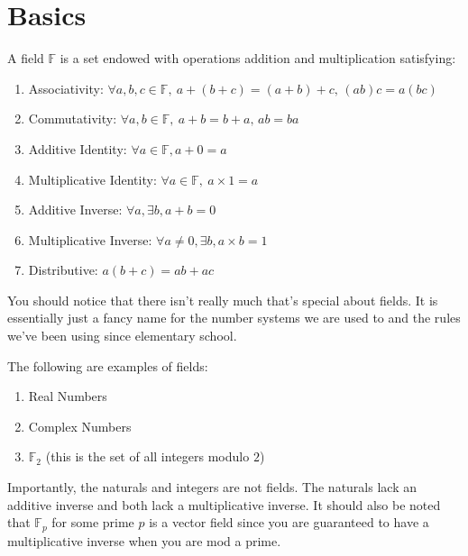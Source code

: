 \chapter{Basics}

\begin{definition}
    A field $\mathbb{F}$ is a set endowed with operations addition and multiplication satisfying:
    \begin{enumerate}
        \item Associativity: $\forall a,b,c\in\mathbb{F},\ a+(b+c)=(a+b)+c,\,(ab)c=a(bc)$
        \item Commutativity: $\forall a,b\in\mathbb{F},\ a+b=b+a,\, ab=ba$
        \item Additive Identity: $\forall a\in\mathbb{F}, a+0=a$
        \item Multiplicative Identity: $\forall a\in\mathbb{F},\ a\times 1=a$
        \item Additive Inverse: $\forall a,\exists b, a+b=0$
        \item Multiplicative Inverse: $\forall a\neq 0,\exists b, a\times b=1$
        \item Distributive: $a(b+c)=ab+ac$
    \end{enumerate}
\end{definition}
You should notice that there isn't really much that's special about fields. It is essentially just a fancy name for the number systems we are used to and the rules we've been using since elementary school.
\begin{example} The following are examples of fields:
    \begin{enumerate}
        \item Real Numbers
        \item Complex Numbers
        \item $\mathbb{F}_2$ (this is the set of all integers modulo $2$)
    \end{enumerate}
\end{example}
Importantly, the naturals and integers are not fields. The naturals lack an additive inverse and both lack a multiplicative inverse. It should also be noted that $\mathbb{F}_p$ for some prime $p$ is a vector field since you are guaranteed to have a multiplicative inverse when you are mod a prime.
